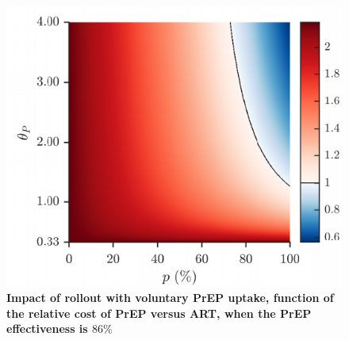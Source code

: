 \documentclass[11pt]{article}
\begin{document}
\newpage
\begin{figure}[H]	
\small	
\centering		
\includegraphics{Figures/Fig_S4}	
\caption[Impact of rollout with voluntary PrEP uptake, function of the relative cost of PrEP versus ART, when the PrEP effectiveness is $86\%$]{%
	{\bf Impact of rollout with voluntary PrEP uptake, function of the relative cost of PrEP versus ART, when the PrEP effectiveness is $86\%$}\\
}
\end{figure}
\end{document}
